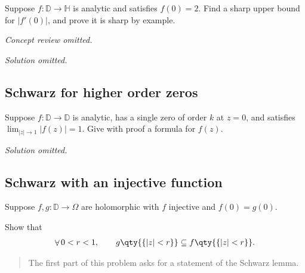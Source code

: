 \begin{problem}[?]

Suppose \(f: {\mathbb{D}}\to {\mathbb{H}}\) is analytic and satisfies
\(f(0) = 2\). Find a sharp upper bound for
\({\left\lvert {f'(0)} \right\rvert}\), and prove it is sharp by
example.

\end{problem}

\emph{Concept review omitted.}

\emph{Solution omitted.}

\hypertarget{schwarz-for-higher-order-zeros}{%
\subsection{Schwarz for higher order
zeros}\label{schwarz-for-higher-order-zeros}}

\begin{problem}[?]

Suppose \(f:{\mathbb{D}}\to{\mathbb{D}}\) is analytic, has a single zero
of order \(k\) at \(z=0\), and satisfies
\(\lim_{{\left\lvert {z} \right\rvert} \to 1} {\left\lvert {f(z)} \right\rvert} = 1\).
Give with proof a formula for \(f(z)\).

\end{problem}

\emph{Solution omitted.}

\hypertarget{schwarz-with-an-injective-function}{%
\subsection{Schwarz with an injective
function}\label{schwarz-with-an-injective-function}}

\begin{problem}[?]

Suppose \(f, g: {\mathbb{D}}\to \Omega\) are holomorphic with \(f\)
injective and \(f(0) = g(0)\).

Show that
\begin{align*}  
\mathop{\mathrm{\forall}}0 < r < 1,\qquad g\qty{\left\{{{\left\lvert {z} \right\rvert} < r}\right\}} \subseteq f\qty{\left\{{{\left\lvert {z} \right\rvert} < r}\right\}}
.\end{align*}

\begin{quote}
The first part of this problem asks for a statement of the Schwarz
lemma.
\end{quote}

\end{problem}

